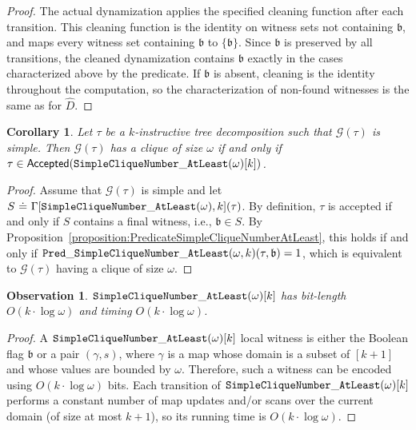 \documentclass[11pt,a4paper]{article}
\newtheorem{observation}[theorem]{Observation}
\newtheorem{corollary}[theorem]{Corollary}
\newcommand{\truevalue}{1}
\newcommand{\treewidthvalue}{k}
\newcommand{\decompositiongraph}[1]{\mathcal{G}(#1)}
\newcommand{\accepteddecompositions}[1]{\mathsf{Accepted}(#1)}
\newcommand{\abstractdecomposition}{\tau}
\newcommand{\defeq}{~\dot{=}~}
\newcommand{\dpNamePart}[1]{\mbox{\normalfont\ttfamily #1}}
\newcommand{\simpleCliqueNumberAtLeastCore}[1]{\dpNamePart{SimpleCliqueNumber}\_\allowbreak\dpNamePart{AtLeast}(#1)}
\newcommand{\dynamizationfunctionname}[1]{\Gamma[{#1}]}
\newcommand{\dynamizationfunction}[2]{\dynamizationfunctionname{#1,#2}}
\newcommand{\cliqueparameter}{\omega}
\newcommand{\cliquemap}{\gamma}
\newcommand{\cliquesize}{s}
\newcommand{\cliquefound}{\mathfrak{b}}
\newcommand{\predicateSimpleCliqueNumberAtLeast}[2]{\dpNamePart{Pred}\_\allowbreak\dpNamePart{SimpleCliqueNumber}\_\allowbreak\dpNamePart{AtLeast}(#1,#2)}
\begin{document}
{\begin{proof}
				The actual dynamization applies the specified cleaning function after each transition. This cleaning function is the identity on witness sets not containing $\cliquefound$, and maps every witness set containing $\cliquefound$ to $\{\cliquefound\}$. Since $\cliquefound$ is preserved by all transitions, the cleaned dynamization contains $\cliquefound$ exactly in the cases characterized above by the predicate. If $\cliquefound$ is absent, cleaning is the identity throughout the computation, so the characterization of non-found witnesses is the same as for $\widehat D$.
				\end{proof}


			\begin{corollary}
				\label{corollary:CorrectnessSimpleCliqueNumberAtLeast}
				Let $\abstractdecomposition$ be a $\treewidthvalue$-instructive tree
				decomposition such that $\decompositiongraph{\abstractdecomposition}$ is simple. Then $\decompositiongraph{\abstractdecomposition}$
				has a clique of size $\cliqueparameter$ if and only if $\abstractdecomposition\in
					\accepteddecompositions{\simpleCliqueNumberAtLeastCore{\cliqueparameter}[\treewidthvalue]}$.
			\end{corollary}
			\begin{proof}
			Assume that $\decompositiongraph{\abstractdecomposition}$ is simple and let
			$S\defeq \dynamizationfunction{\simpleCliqueNumberAtLeastCore{\cliqueparameter}}{\treewidthvalue}(\abstractdecomposition)$.
			By definition, $\abstractdecomposition$ is accepted if and only if $S$ contains a final witness, i.e., $\cliquefound\in S$.
			By Proposition~\ref{proposition:PredicateSimpleCliqueNumberAtLeast}, this holds if and only if
			$\predicateSimpleCliqueNumberAtLeast{\cliqueparameter}{\treewidthvalue}(\abstractdecomposition,\cliquefound)=\truevalue$, which is equivalent to
			$\decompositiongraph{\abstractdecomposition}$ having a clique of size $\cliqueparameter$.
			\end{proof}



		\begin{observation}
			\label{observation:ComplexityMeasuresClique}
			$\simpleCliqueNumberAtLeastCore{\cliqueparameter}[\treewidthvalue]$ has bit-length
			$O(\treewidthvalue\cdot \log \cliqueparameter)$ and timing
			$O(\treewidthvalue\cdot \log \cliqueparameter)$.
		\end{observation}

		\begin{proof}
			A $\simpleCliqueNumberAtLeastCore{\cliqueparameter}[\treewidthvalue]$ local witness is either the Boolean flag $\cliquefound$ or a pair $(\cliquemap,\cliquesize)$, where $\cliquemap$ is a map whose domain is a subset of $[\treewidthvalue+1]$ and whose values are bounded by $\cliqueparameter$. Therefore, such a witness can be encoded using $O(\treewidthvalue\cdot \log \cliqueparameter)$ bits.
			Each transition of $\simpleCliqueNumberAtLeastCore{\cliqueparameter}[\treewidthvalue]$ performs a constant number of map updates and/or scans over the current domain (of size at most $\treewidthvalue+1$), so its running time is $O(\treewidthvalue\cdot \log \cliqueparameter)$.
		\end{proof}

}
\end{document}
